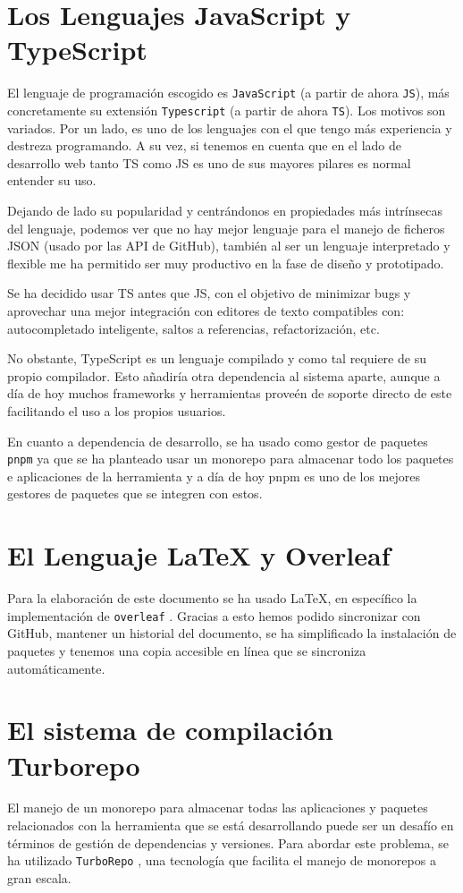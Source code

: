 \section{Los Lenguajes JavaScript y TypeScript}
El lenguaje de programación escogido es \verb|JavaScript| \cite{js} (a partir de ahora \verb|JS|), más concretamente su extensión \verb|Typescript| \cite{ts} (a partir de ahora \verb|TS|). Los motivos son variados. Por un lado, es uno de los lenguajes con el que tengo más experiencia y destreza programando. A su vez, si tenemos en cuenta que en el lado de desarrollo web tanto TS como JS es uno de sus mayores pilares es normal entender su uso.

Dejando de lado su popularidad y centrándonos en propiedades más intrínsecas del lenguaje, podemos ver que no hay mejor lenguaje para el manejo de ficheros JSON (usado por las API de GitHub), también al ser un lenguaje interpretado y flexible me ha permitido ser muy productivo en la fase de diseño y prototipado.

Se ha decidido usar TS antes que JS, con el objetivo de minimizar bugs y aprovechar una mejor integración con editores de texto compatibles con: autocompletado inteligente, saltos a referencias, refactorización, etc.

No obstante, TypeScript es un lenguaje compilado y como tal requiere de su propio compilador. 
Esto añadiría otra dependencia al sistema aparte, aunque a día de hoy muchos frameworks y herramientas proveén de soporte directo de este facilitando el uso a los propios usuarios. 

En cuanto a dependencia de desarrollo, se ha usado como gestor de paquetes \verb|pnpm| \cite{pnpm} ya que se ha planteado usar un monorepo para almacenar todo los paquetes e aplicaciones de la herramienta y a día de hoy pnpm es uno de los mejores gestores de paquetes que se integren con estos.

\section{El Lenguaje \LaTeX{} y Overleaf}
Para la elaboración de este documento se ha usado \LaTeX{}, 
en específico la implementación de \verb|overleaf| \cite{overleaf}.
Gracias a esto hemos podido sincronizar con GitHub,
mantener un historial del documento, 
se ha simplificado la instalación de paquetes  y 
tenemos una copia accesible en línea que se sincroniza automáticamente.

\section{El sistema de compilación Turborepo}
El manejo de un monorepo para almacenar todas las aplicaciones y paquetes relacionados con la herramienta que se está desarrollando puede ser un desafío en términos de gestión de dependencias y versiones. Para abordar este problema, se ha utilizado \verb|TurboRepo| \cite{turborepo}, una tecnología que facilita el manejo de monorepos a gran escala.

